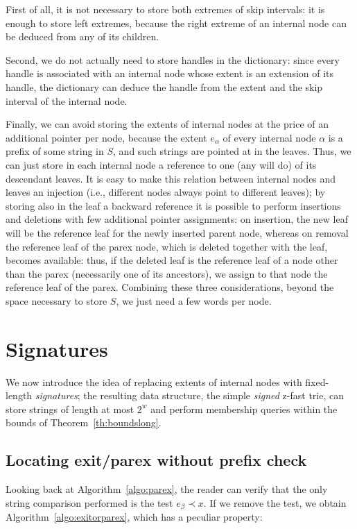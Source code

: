 \documentclass[a4paper]{article}
\newcommand{\?}{\mskip1.5mu}
\begin{document}
First of all, it is not necessary to store both extremes of skip intervals: 
it is enough to store left extremes, because the
right extreme of an internal node can be deduced from any of its children.

Second, we do not actually need to store handles in the dictionary: since every handle
is associated with an internal node whose extent is an extension of its handle,
the dictionary can deduce the handle from the extent and the skip interval of the internal node.

Finally, we can avoid storing the extents of internal nodes at the price of an
additional pointer per node, because the extent $e_\alpha$ of every internal
node $\alpha$ is a prefix of some string in $S$, and such strings are pointed at
in the leaves. Thus, we can just store in each internal node a reference to one
(any will do) of its descendant leaves. It is easy to make this relation between
internal nodes and leaves an injection (i.e., different nodes always point to
different leaves); by storing also in the leaf a backward reference it is
possible to perform insertions and deletions with few additional pointer assignments:
on insertion, the new leaf will be the reference leaf for the newly inserted parent node, whereas on removal
the reference leaf of the parex node, which is deleted together with the leaf, becomes available: thus, if the deleted
leaf is the reference leaf of a node other than the parex (necessarily one of its ancestors), we assign to that node
the reference leaf of the parex. 
Combining these three
considerations, beyond the space necessary to
store $S$, we just need a few words per node.

\section{Signatures}
\label{sec:sign}

We now introduce the idea of replacing extents of internal nodes with fixed-length \emph{signatures}; the resulting
data structure, the simple \emph{signed} z-fast trie, can store strings of length at most $2^w$ and
perform membership queries within the bounds of Theorem~\ref{th:boundslong}.

\subsection{Locating exit/parex without prefix check}
\label{sec:exitorparex}

Looking back at Algorithm~\ref{algo:parex}, the reader can verify that the only string comparison
performed is the test $e_\beta\prec x$. If we remove the test, we obtain
Algorithm~\ref{algo:exitorparex}, which has a peculiar
property:
\end{document}
